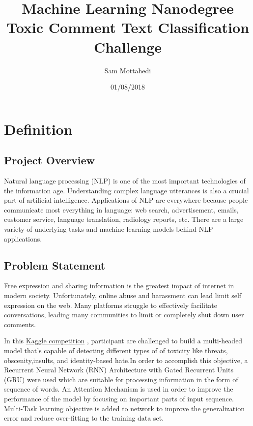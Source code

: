 \documentclass{article}
\title{Machine Learning Nanodegree \\ Toxic Comment Text Classification Challenge}
\author{Sam Mottahedi}
\date{01/08/2018}
\begin{document}
\maketitle


\section{Definition}

    \subsection{Project Overview}

    Natural language processing (NLP) is one of the most important technologies of the information age. Understanding complex language utterances is also a crucial part of artificial intelligence. Applications of NLP are everywhere because people communicate most everything in language: web search, advertisement, emails, customer service, language translation, radiology reports, etc. There are a large variety of underlying tasks and machine learning models behind NLP applications.


    \subsection{Problem Statement}


    Free expression and sharing information is the greatest impact of internet in modern society. Unfortunately, online abuse and harassment can lead limit self expression on the web. Many platforms struggle to effectively
    facilitate conversations, leading many communities to limit or
    completely shut down user comments.

    In this \href{https://www.kaggle.com/c/jigsaw-toxic-comment-classification-challenge}{Kaggle competition} ,  participant are challenged to build a multi-headed model that’s capable of detecting different types of of toxicity like threats, obscenity,insults, and identity-based hate.In order to accomplish this objective, a Recurrent Neural Network (RNN) Architecture with Gated Recurrent Units (GRU) were used which are suitable for processing information in the form of sequence of words. An Attention Mechanism is used in order to improve the performance of the model by focusing on important parts of input sequence. Multi-Task learning objective is added to network to improve the generalization error and reduce over-fitting to the training data set.
\end{document}
